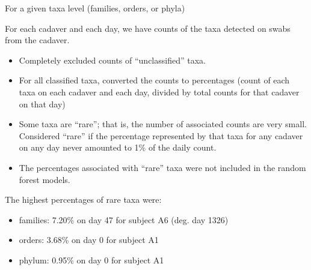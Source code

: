 \documentclass{beamer}
\begin{document}
\begin{frame}{For a given taxa level (families, orders, or phyla)}

  {\scriptsize

  \noindent For each cadaver and each day, we have counts of the taxa
  detected on swabs from the cadaver.

  \begin{itemize}
  \item Completely excluded counts of ``unclassified'' taxa.
   \item For all classified taxa, converted the counts to percentages (count of each taxa on each cadaver and each day, divided by total counts for that cadaver on that day)
    \item Some taxa are ``rare''; that is, the number of associated
      counts are very small.  Considered ``rare'' if the percentage
      represented by that taxa for any cadaver on any day never
      amounted to 1\% of the daily count.
      \item The percentages associated with ``rare'' taxa were not
        included in the random forest models.
    \end{itemize}

  \vspace{0.1in}
  
  \noindent The highest percentages of rare taxa were:
  \begin{itemize}
  \item families: 7.20\% on day 47 for subject A6 (deg. day 1326)
  \item orders: 3.68\% on day 0 for subject A1
  \item phylum: 0.95\% on day 0 for subject A1
      \end{itemize}
}

\end{frame}
\end{document}
